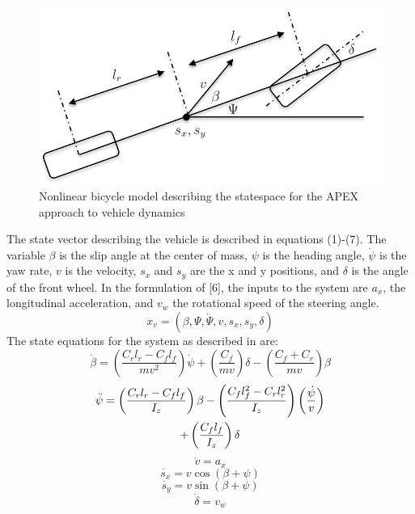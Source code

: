 \documentclass{easychair}
\theoremstyle{theorem}
\theoremstyle{remark}
\begin{document}
\begin{figure}[b]
	\centering
	\includegraphics[scale=.5]{figures/bicycle_model}
	\caption{Nonlinear bicycle model describing the statespace for the APEX approach to vehicle dynamics}
	\label{fig:bike}
\end{figure}

The state vector describing the vehicle is described in equations (1)-(7). 
The variable \(\beta\) is the slip angle at the center of mass, \(\psi\) is the heading angle, \(\dot{\psi}\) is the yaw rate, \(v\) is the velocity, \(s_x\) and \(s_y\) are the x and y positions, and \(\delta\) is the angle of the front wheel. In the formulation of [6], the inputs to the system are \(a_x\), the longitudinal acceleration, and \(v_w\) the rotational speed of the steering angle. 
\begin{equation}
x_v = (\beta,\Psi,\dot{\Psi}, v, s_x, s_y, \delta)
\end{equation}	
The state equations for the system as described in \cite{Althoff2014} are:
\begin{equation}
\label{eqn:beta}
\dot{\beta}=\left(\frac{C_rl_r-C_fl_f}{mv^2} \right)\dot{\psi}+\left(\frac{C_f}{mv} \right)\delta-\left(\frac{C_f+C_r}{mv} \right)\beta
\end{equation}
\begin{gather}
\label{eqn:psi}
\ddot{\psi}=\left(\frac{C_rl_r-C_fl_f}{I_z} \right)\beta-\left(\frac{C_fl_f^2-C_rl_r^2}{I_z} \right)\left(\frac{\dot{\psi}}{v} \right) \notag \\
+\left(\frac{C_fl_f}{I_z} \right)\delta
\end{gather}
\begin{equation}
\label{eqn:v}
\dot{v}=a_x
\end{equation}
\begin{equation}
\label{eqn:sx}
\dot{s_x}=v\cos{(\beta+\psi)}
\end{equation}
\begin{equation}
\label{eqn:sy}
\dot{s_y}=v\sin{(\beta+\psi)}	
\end{equation}	
\begin{equation}
\label{eqn:delta}
\dot{\delta}=v_w
\end{equation}
\end{document}
